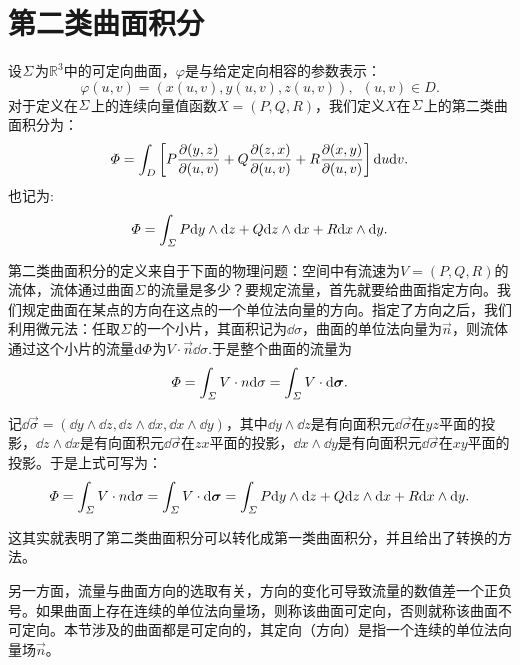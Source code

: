 \section{第二类曲面积分}
    \begin{definition}[第二类曲面积分]
        设\(\mit\Sigma\)为\(\mathbb{R}^3\)中的可定向曲面，\(\varphi\)是与给定定向相容的参数表示：\[\varphi(u,v)=(x(u,v),y(u,v),z(u,v)),\enspace(u,v)\in D.\]
        对于定义在\(\mit\Sigma\)上的连续向量值函数\(X=(P,Q,R)\)，我们定义\(X\)在\(\mit\Sigma\)上的第二类曲面积分为：\[\mit\Phi=\int_{D}\left[P\frac{\partial(y,z)}{\partial(u,v)}+Q\frac{\partial(z,x)}{\partial(u,v)}+R\frac{\partial(x,y)}{\partial(u,v)}\right]\mathrm{d} u\mathrm{d} v.\]
        也记为:\[\mit\Phi=\int_{\mit\Sigma}P\mathrm{d} y\wedge\mathrm{d} z+Q\mathrm{d} z\wedge\mathrm{d} x+R\mathrm{d} x\wedge\mathrm{d} y.\]
    \end{definition}
    
    第二类曲面积分的定义来自于下面的物理问题：空间中有流速为\(V=(P,Q,R)\)的流体，流体通过曲面\(\mit\Sigma\)的流量是多少？要规定流量，首先就要给曲面指定方向。我们规定曲面在某点的方向在这点的一个单位法向量的方向。指定了方向之后，我们利用微元法：任取\(\mit\Sigma\)的一个小片，其面积记为\(\dd\sigma\)，曲面的单位法向量为\(\vec{n}\)，则流体通过这个小片的流量\(\mathrm{d}\mit\Phi\)为\(V\cdot\vec{n}\dd\sigma\).于是整个曲面的流量为
    \begin{equation}
        \mit\Phi=\int_{\mit\Sigma}V\cdot\boldsymbol{n}\mathrm{d}\sigma=\int_{\mit\Sigma}V\cdot\mathrm{d}\boldsymbol{\sigma}. \label{eq:第二类曲面积分:流量}
    \end{equation}

    记\(\dd\vec{\sigma}=(\dd y\wedge\dd z,\dd z\wedge\dd x,\dd x\wedge\dd y)\)，其中\(\dd y\wedge\dd z\)是有向面积元\(\dd\vec{\sigma}\)在\(yz\)平面的投影，\(\dd z\wedge\dd x\)是有向面积元\(\dd\vec{\sigma}\)在\(zx\)平面的投影，\(\dd x\wedge\dd y\)是有向面积元\(\dd\vec{\sigma}\)在\(xy\)平面的投影。于是上式可写为：
    \begin{equation}
        \mit\Phi=\int_{\mit\Sigma}V\cdot\boldsymbol{n}\mathrm{d}\sigma=\int_{\mit\Sigma}V\cdot\mathrm{d}\boldsymbol{\sigma}=\int_{\mit\Sigma}P\mathrm{d} y\wedge\mathrm{d} z+Q\mathrm{d} z\wedge\mathrm{d} x+R\mathrm{d} x\wedge\mathrm{d} y.\label{eq:第二类曲面积分:ver2}
    \end{equation}

    这其实就表明了第二类曲面积分可以转化成第一类曲面积分，并且给出了转换的方法。

    另一方面，流量与曲面方向的选取有关，方向的变化可导致流量的数值差一个正负号。如果曲面上存在连续的单位法向量场，则称该曲面可定向，否则就称该曲面不可定向。本节涉及的曲面都是可定向的，其定向（方向）是指一个连续的单位法向量场\(\vec{n}\)。


